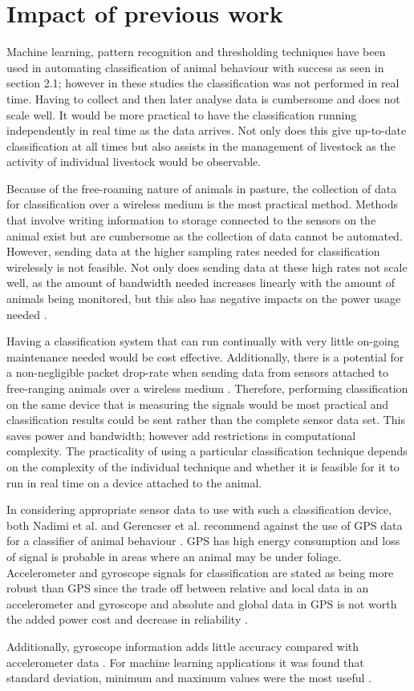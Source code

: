 \section{Impact of previous work}

Machine learning, pattern recognition and thresholding techniques have been used in automating classification of animal behaviour with success as seen in section 2.1; however in these studies the classification was not performed in real time. Having to collect and then later analyse data is cumbersome and does not scale well. It would be more practical to have the classification running independently in real time as the data arrives. Not only does this give up-to-date classification at all times but also assists in the management of livestock as the activity of individual livestock would be observable. 

Because of the free-roaming nature of animals in pasture, the collection of data for classification over a wireless medium is the most practical method. Methods that involve writing information to storage connected to the sensors on the animal exist but are cumbersome as the collection of data cannot be automated. However, sending data at the higher sampling rates needed for classification \cite{Guo2006} \cite{Clapham2011} wirelessly is not feasible. Not only does sending data at these high rates not scale well, as the amount of bandwidth needed increases linearly with the amount of animals being monitored, but this also has negative impacts on the power usage needed \cite{Nadimi2012}. 

Having a classification system that can run continually with very little on-going maintenance needed would be cost effective. Additionally, there is a potential for a non-negligible packet drop-rate when sending data from sensors attached to free-ranging animals over a wireless medium \cite{Nadimi2012}. Therefore, performing classification on the same device that is measuring the signals would be most practical and classification results could be sent rather than the complete sensor data set. This saves power and bandwidth; however add restrictions in computational complexity. The practicality of using a particular classification technique depends on the complexity of the individual technique and whether it is feasible for it to run in real time on a device attached to the animal.

In considering appropriate sensor data to use with such a classification device, both Nadimi et al. and Gerencser et al. recommend against the use of GPS data for a classifier of animal behaviour \cite{Nadimi2012} \cite{Gerencser2013}. GPS has high energy consumption and loss of signal is probable in areas where an animal may be under foliage. Accelerometer and gyroscope signals for classification are stated as being more robust than GPS since the trade off between relative and local data in an accelerometer and gyroscope and absolute and global data in GPS is not worth the added power cost and decrease in reliability \cite{Gerencser2013}.

Additionally, gyroscope information adds little accuracy compared with accelerometer data \cite{Gerencser2013}. For machine learning applications it was found that standard deviation, minimum and maximum values were the most useful \cite{Gerencser2013}. 